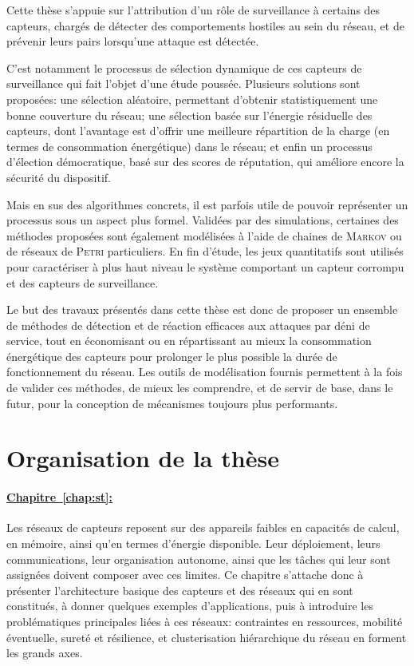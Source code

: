 Cette thèse s'appuie sur l'attribution d'un rôle de surveillance à certains des capteurs, chargés de détecter des comportements hostiles au sein du réseau, et de prévenir leurs pairs lorsqu'une attaque est détectée.

C'est notamment le processus de sélection dynamique de ces capteurs de surveillance qui fait l'objet d'une étude poussée.
Plusieurs solutions sont proposées: une sélection aléatoire, permettant d'obtenir statistiquement une bonne couverture du réseau; une sélection basée sur l'énergie résiduelle des capteurs, dont l'avantage est d'offrir une meilleure répartition de la charge (en termes de consommation énergétique) dans le réseau; et enfin un processus d'élection démocratique, basé sur des scores de réputation, qui améliore encore la sécurité du dispositif.

Mais en sus des algorithmes concrets, il est parfois utile de pouvoir représenter un processus sous un aspect plus formel.
Validées par des simulations, certaines des méthodes proposées sont également modélisées à l'aide de chaines de \textsc{Markov} ou de réseaux de \textsc{Petri} particuliers.
En fin d'étude, les jeux quantitatifs sont utilisés pour caractériser à plus haut niveau le système comportant un capteur corrompu et des capteurs de surveillance.
\pagebreak %

Le but des travaux présentés dans cette thèse est donc de proposer un ensemble de méthodes de détection et de réaction efficaces aux attaques par déni de service, tout en économisant ou en répartissant au mieux la consommation énergétique des capteurs pour prolonger le plus possible la durée de fonctionnement du réseau.
Les outils de modélisation fournis permettent à la fois de valider ces méthodes, de mieux les comprendre, et de servir de base, dans le futur, pour la conception de mécanismes toujours plus performants.

\section{Organisation de la thèse}

\newcommand\chappar[1]{%
    \paragraph{\hyperref[chap:#1]{%
        Chapitre~\ref*{chap:#1}: \nameref*{chap:#1}%
}}}

\chappar{st}
Les réseaux de capteurs reposent sur des appareils faibles en capacités de calcul, en mémoire, ainsi qu'en termes d'énergie disponible.
Leur déploiement, leurs communications, leur organisation autonome, ainsi que les tâches qui leur sont assignées doivent composer avec ces limites.
Ce chapitre s'attache donc à présenter l'architecture basique des capteurs et des réseaux qui en sont constitués, à donner quelques exemples d'applications, puis à introduire les problématiques principales liées à ces réseaux: contraintes en ressources, mobilité éventuelle, sureté et résilience, et clusterisation hiérarchique du réseau en forment les grands axes.

